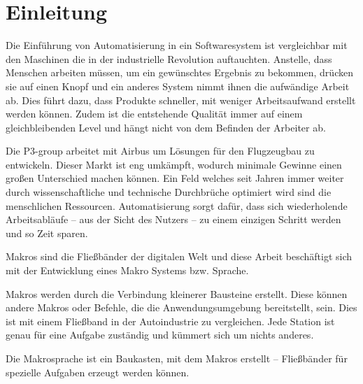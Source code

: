 




\tableofcontents
\newpage

\section{Einleitung}
\label{sec:einleitung}
  Die Einführung von Automatisierung in ein Softwaresystem ist vergleichbar mit den Maschinen die in der industrielle Revolution auftauchten. Anstelle, dass Menschen arbeiten müssen, um ein gewünschtes Ergebnis zu bekommen, drücken sie auf einen Knopf und ein anderes System nimmt ihnen die aufwändige Arbeit ab. Dies führt dazu, dass Produkte schneller, mit weniger Arbeitsaufwand erstellt werden können. Zudem ist die entstehende Qualität immer auf einem gleichbleibenden Level und hängt nicht von dem Befinden der Arbeiter ab.

  Die P3-group arbeitet mit Airbus um Lösungen für den Flugzeugbau zu entwickeln. Dieser Markt ist eng umkämpft, wodurch minimale Gewinne einen großen Unterschied machen können. Ein Feld welches seit Jahren immer weiter durch wissenschaftliche und technische Durchbrüche optimiert wird sind die menschlichen Ressourcen. Automatisierung sorgt dafür, dass sich wiederholende Arbeitsabläufe -- aus der Sicht des Nutzers -- zu einem einzigen Schritt werden und so Zeit sparen.

  Makros sind die Fließbänder der digitalen Welt und diese Arbeit beschäftigt sich mit der Entwicklung eines Makro Systems bzw. Sprache.

  Makros werden durch die Verbindung kleinerer Bausteine erstellt. Diese können andere Makros oder Befehle, die die Anwendungsumgebung bereitstellt, sein. Dies ist mit einem Fließband in der Autoindustrie zu vergleichen. Jede Station ist genau für eine Aufgabe zuständig und kümmert sich um nichts anderes.

  Die Makrosprache ist ein Baukasten, mit dem Makros erstellt -- Fließbänder für spezielle Aufgaben erzeugt werden können.



